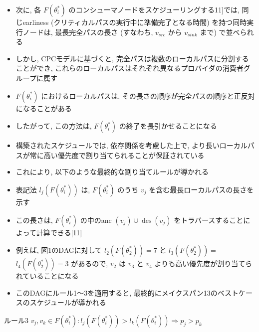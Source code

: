 \begin{frame}{}
    \begin{itemize}
        \item 次に, 各 $F\left(\theta_{i}^{*}\right)$ のコンシューマノードをスケジューリングする11]では, 同じearliness (クリティカルパスの実行中に準備完了となる時間) を持つ同時実行ノードは, 最長完全パスの長さ (すなわち, $v_{s r c}$ から $v_{s i n k}$ まで) で並べられる
        \item しかし, CPCモデルに基づくと, 完全パスは複数のローカルパスに分割することができ, これらのローカルパスはそれぞれ異なるプロバイダの消費者グループに属す
        \item $F\left(\theta_{i}^{*}\right)$ におけるローカルパスは, その長さの順序が完全パスの順序と正反対になることがある
        \item したがって, この方法は, $F\left(\theta_{i}^{*}\right)$ の終了を長引かせることになる
    \end{itemize}
\end{frame}

\begin{frame}{}
    \begin{itemize}
        \item 構築されたスケジュールでは, 依存関係を考慮した上で, より長いローカルパスが常に高い優先度で割り当てられることが保証されている
        \item これにより, 以下のような最終的な割り当てルールが導かれる
        \item 表記法 $l_{j}\left(F\left(\theta_{i}^{*}\right)\right)$ は, $F\left(\theta_{i}^{*}\right)$ のうち $v_{j}$ を含む最長ローカルパスの長さを示す
        \item この長さは, $F\left(\theta_{i}^{*}\right)$ の中のanc $\left(v_{j}\right) \cup \operatorname{des}\left(v_{j}\right)$ をトラバースすることによって計算できる[11]
        \item 例えば, 図1のDAGに対して $l_{2}\left(F\left(\theta_{2}^{*}\right)\right)=7$ と $l_{3}\left(F\left(\theta_{2}^{*}\right)\right)=$  $l_{4}\left(F\left(\theta_{2}^{*}\right)\right)=3$ があるので, $v_{2}$ は $v_{3}$ と $v_{4}$ よりも高い優先度が割り当てられていることになる
        \item このDAGにルール1～3を適用すると, 最終的にメイクスパン13のベストケースのスケジュールが導かれる
    \end{itemize}
\end{frame}

\begin{frame}{ルール3}
    $v_{j}, v_{k} \in F\left(\theta_{i}^{*}\right): l_{j}\left(F\left(\theta_{i}^{*}\right)\right)>l_{k}\left(F\left(\theta_{i}^{*}\right)\right) \Rightarrow p_{j}>p_{k}$
\end{frame}

